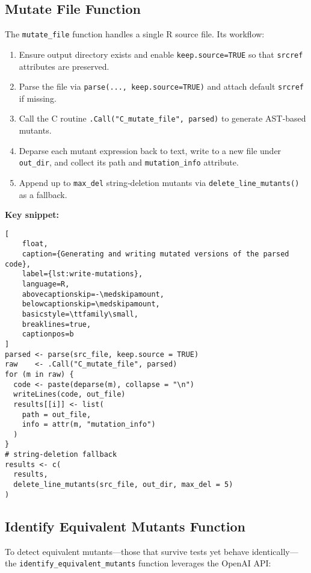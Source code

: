 \subsection{Mutate File Function}

The \texttt{mutate\_file} function handles a single R source file.  Its workflow:

\begin{enumerate}
  \item Ensure output directory exists and enable \texttt{keep.source=TRUE} so that \texttt{srcref} attributes are preserved.  
  \item Parse the file via \texttt{parse(..., keep.source=TRUE)} and attach default \texttt{srcref} if missing.  
  \item Call the C routine \texttt{.Call("C\_mutate\_file", parsed)} to generate AST‐based mutants.  
  \item Deparse each mutant expression back to text, write to a new file under \texttt{out\_dir}, and collect its path and \texttt{mutation\_info} attribute.  
  \item Append up to \texttt{max\_del} string‐deletion mutants via \texttt{delete\_line\_mutants()} as a fallback.
\end{enumerate}

\medskip
\noindent\textbf{Key snippet:}
\begin{lstlisting}[
    float,
    caption={Generating and writing mutated versions of the parsed code},
    label={lst:write-mutations},
    language=R,
    abovecaptionskip=-\medskipamount,
    belowcaptionskip=\medskipamount,
    basicstyle=\ttfamily\small,
    breaklines=true,
    captionpos=b
]
parsed <- parse(src_file, keep.source = TRUE)
raw    <- .Call("C_mutate_file", parsed)
for (m in raw) {
  code <- paste(deparse(m), collapse = "\n")
  writeLines(code, out_file)
  results[[i]] <- list(
    path = out_file,
    info = attr(m, "mutation_info")
  )
}
# string‐deletion fallback
results <- c(
  results,
  delete_line_mutants(src_file, out_dir, max_del = 5)
)
\end{lstlisting}


\subsection{Identify Equivalent Mutants Function}

To detect equivalent mutants—those that survive tests yet behave identically—the \texttt{identify\_equivalent\_mutants} function leverages the OpenAI API:

